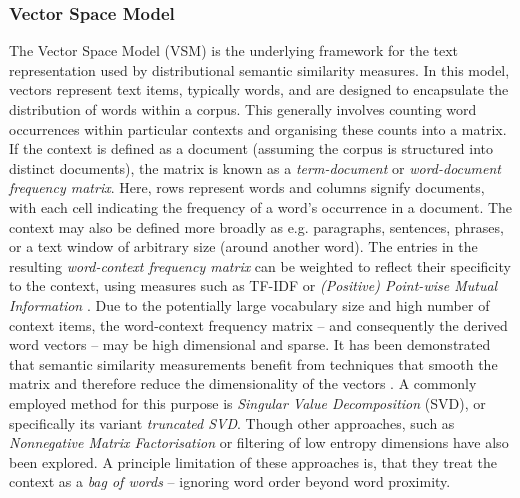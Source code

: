 \documentclass[11pt, numbers=noenddot]{scrreprt}
\let\cite\parencite  %
\begin{document}
\subsubsection{Vector Space Model}
The Vector Space Model (VSM) \cite{turneyFrequencyMeaningVector2010} is the underlying framework for the text representation used by distributional semantic similarity measures. In this model, vectors represent text items, typically words, and are designed to encapsulate the distribution of words within a corpus. This generally involves counting word occurrences within particular contexts and organising these counts into a matrix. If the context is defined as a document (assuming the corpus is structured into distinct documents), the matrix is known as a \textit{term-document} or \textit{word-document frequency matrix}. Here, rows represent words and columns signify documents, with each cell indicating the frequency of a word's occurrence in a document. The context may also be defined more broadly as e.g. paragraphs, sentences, phrases, or a text window of arbitrary size (around another word). The entries in the resulting \textit{word-context frequency matrix} can be weighted to reflect their specificity to the context, using measures such as TF-IDF or \textit{(Positive) Point-wise Mutual Information} \cite{churchWordAssociationNorms1989, niwaCoOccurrenceVectorsCorpora1994}. Due to the potentially large vocabulary size and high number of context items, the word-context frequency matrix -- and consequently the derived word vectors -- may be high dimensional and sparse. It has been demonstrated that semantic similarity measurements benefit from techniques that smooth the matrix and therefore reduce the dimensionality of the vectors \cite{deerwesterIndexingLatentSemantic1990}. A commonly employed method for this purpose is \textit{Singular Value Decomposition} (SVD), or specifically its variant \textit{truncated SVD}. Though other approaches, such as \textit{Nonnegative Matrix Factorisation} \cite{leeLearningPartsObjects1999} or filtering of low entropy dimensions \cite{lundProducingHighdimensionalSemantic1996} have also been explored. A principle limitation of these approaches is, that they treat the context as a \textit{bag of words} -- ignoring word order beyond word proximity.
\end{document}
